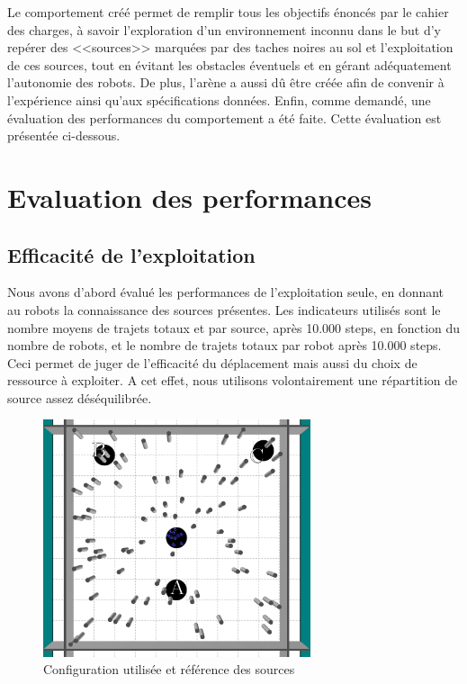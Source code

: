 Le comportement créé permet de remplir tous les objectifs énoncés par le cahier des charges, à savoir l'exploration d'un environnement inconnu dans le but d'y repérer des <<sources>> marquées par des taches noires au sol et l'exploitation de ces sources, tout en évitant les obstacles éventuels et en gérant adéquatement l'autonomie des robots. De plus, l'arène a aussi dû être créée afin de convenir à l'expérience ainsi qu'aux spécifications données. Enfin, comme demandé, une évaluation des performances du comportement a été faite. Cette évaluation est présentée ci-dessous.

\section{Evaluation des performances}

\subsection{Efficacité de l'exploitation}

Nous avons d'abord évalué les performances de l'exploitation seule, en donnant au robots la connaissance des sources présentes. Les indicateurs utilisés sont le nombre moyens de trajets totaux et par source, après 10.000 steps, en fonction du nombre de robots, et le nombre de trajets totaux par robot après 10.000 steps. Ceci permet de juger de l'efficacité du déplacement mais aussi du choix de ressource à exploiter. A cet effet, nous utilisons volontairement une répartition de source assez déséquilibrée.
\begin{figure}[htbp]
  \centering
  \includegraphics[width=0.7\textwidth]{pics/initArenaNames.png}
  \caption{Configuration utilisée et référence des sources}
\end{figure}

